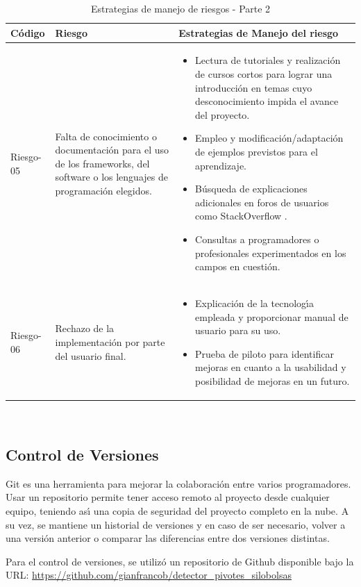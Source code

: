 \begin{table}[h!]
    \begin{tabular}{ | m{1.5cm} | m{5cm}| m{5cm} |}
        \hline
        \textbf{Código} & \textbf{Riesgo} & \textbf{Estrategias de Manejo del riesgo} \\
        \hline
         Riesgo-05 & Falta de conocimiento o documentación para el uso de los frameworks, del software o los lenguajes de programación elegidos.&  \begin{itemize} 
                    \item Lectura de tutoriales y realización de cursos cortos para lograr una introducción en temas cuyo desconocimiento impida el avance del proyecto.
                    \item Empleo y modificación/adaptación de ejemplos previstos para el aprendizaje.
                    \item Búsqueda de explicaciones adicionales en foros de usuarios como StackOverflow \cite{stackoverflow}.
                    \item Consultas a programadores o profesionales experimentados en los campos en cuestión.
                \end{itemize}\\
        \hline
        Riesgo-06 &Rechazo de la implementación por parte del usuario final.  & 
        \begin{itemize} 
            \item Explicación de la tecnologı́a empleada y proporcionar manual de usuario para su uso.
            \item  Prueba de piloto para identificar mejoras en cuanto a la usabilidad y posibilidad de mejoras en un futuro.
                \end{itemize}\\
        \hline
    \end{tabular}\\
    \caption{Estrategias de manejo de riesgos - Parte 2}
    \label{manejoriesgos2}
\end{table}

\newpage
\subsection{Control de Versiones }
Git es una herramienta para mejorar la colaboración entre varios programadores. Usar un repositorio permite tener acceso remoto al proyecto desde cualquier equipo, teniendo ası́ una copia de seguridad del proyecto completo en la nube. A su vez, se mantiene un historial de versiones y en caso de ser necesario, volver a una versión anterior o comparar las diferencias entre dos versiones distintas.

Para el control de versiones, se utilizó un repositorio de Github disponible bajo la URL:  \url{https://github.com/gianfrancob/detector_pivotes_silobolsas}
\newpage
